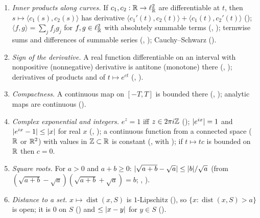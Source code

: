 {\raggedright
\begin{enumerate}[label=(W8-E\arabic*),ref=(W8-E\arabic*)]
\item\label{bpW:w8:ext-inner} \emph{Inner products along curves.} If $c_1,c_2:\mathbb{R}\to\ell^2_{\mathbb{R}}$ are differentiable at
  $t$, then $s\mapsto\langle c_1(s),c_2(s)\rangle$ has derivative $\langle c_1'(t),c_2(t)\rangle+\langle
  c_1(t),c_2'(t)\rangle$ (); $\langle f,g\rangle=\sum_jf_jg_j$ for $f,g\in\ell^2_{\mathbb{R}}$ with
  absolutely summable terms (, ); termwise sums and differences of
  summable series (, ); Cauchy--Schwarz
  ().
\item\label{bpW:w8:ext-mono} \emph{Sign of the derivative.} A real function differentiable on an interval with
  nonpositive (nonnegative) derivative is antitone (monotone) there (,
  ); derivatives of products and of $t\mapsto e^{ct}$ (,
  ).
\item\label{bpW:w8:ext-compact} \emph{Compactness.} A continuous map on $[-T,T]$ is bounded there
  (, ); analytic maps are continuous
  ().
\item\label{bpW:w8:ext-exp} \emph{Complex exponential and integers.} $e^{z}=1$ iff $z\in2\pi i\mathbb{Z}$
  (); $\lvert e^{ix}\rvert=1$ and $\lvert e^{ix}-1\rvert\le\lvert x\rvert$ for real $x$
  (, ); a continuous
  function from a connected space ($\mathbb{R}$ or $\mathbb{R}^2$) with values in $\mathbb{Z}\subset\mathbb{R}$ is constant
  (, with ); if $t\mapsto tc$ is bounded on $\mathbb{R}$ then $c=0$.
\item\label{bpW:w8:ext-sqrt} \emph{Square roots.} For $a>0$ and $a+b\ge0$: $\lvert \sqrt{a+b}-\sqrt a\rvert\le\lvert b\rvert/\sqrt a$
  (from $(\sqrt{a+b}-\sqrt a)(\sqrt{a+b}+\sqrt a)=b$; , ).
\item\label{bpW:w8:ext-dist} \emph{Distance to a set.} $x\mapsto\operatorname{dist}(x,S)$ is $1$-Lipschitz
  (), so $\{x:\operatorname{dist}(x,S)>a\}$ is open; it is $0$ on $S$
  () and $\le\lvert x-y\rvert$ for $y\in S$ ().

\end{enumerate}}
